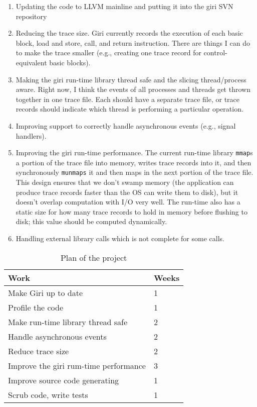 \documentclass[DIV=calc, paper=a4, fontsize=11pt, twocolumn]{scrartcl}
\begin{document}
\begin{enumerate}
\item Updating the code to LLVM mainline and putting it into the giri SVN repository
\item Reducing the trace size.
Giri currently records the execution of each basic block, load and store, call, and return instruction.
There are things I can do to make the trace smaller (e.g., creating one trace record for control-equivalent basic blocks).
\item Making the giri run-time library thread safe and the slicing thread/process aware.
Right now, I think the events of all processes and threads get thrown together in one trace file.
Each should have a separate trace file, or trace records should indicate which thread is performing a particular operation.
\item Improving support to correctly handle asynchronous events (e.g., signal handlers).
\item Improving the giri run-time performance.
The current run-time library \texttt{mmap}s a portion of the trace file into memory, writes trace records into it,
and then synchronously \texttt{munmaps} it and then maps in the next portion of the trace file.
This design ensures that we don't swamp memory (the application can produce trace records faster than the OS can write them to disk),
but it doesn't overlap computation with I/O very well.
The run-time also has a static size for how many trace records to hold in memory before flushing to disk;
this value should be computed dynamically.
\item Handling external library calls which is not complete for some calls.
\end{enumerate}

\begin{table}[h]
\caption{Plan of the project}
\centering
\begin{tabular}{l|l}
\toprule
\textbf{Work} & \textbf{Weeks} \\
\midrule
Make Giri up to date & 1 \\
\midrule
Profile the code & 1 \\
\midrule
Make run-time library thread safe & 2 \\
\midrule
Handle asynchronous events & 2 \\
\midrule
Reduce trace size & 2 \\
\midrule
Improve the giri rum-time performance & 3 \\
\midrule
Improve source code generating & 1 \\
\midrule
Scrub code, write tests & 1 \\
\bottomrule
\end{tabular}
\end{table}
\end{document}
